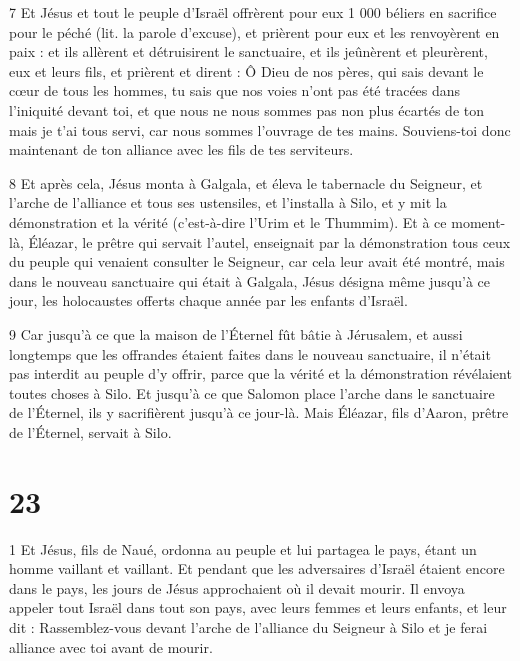 \par 7 Et Jésus et tout le peuple d'Israël offrèrent pour eux 1 000 béliers en sacrifice pour le péché (lit. la parole d'excuse), et prièrent pour eux et les renvoyèrent en paix : et ils allèrent et détruisirent le sanctuaire, et ils jeûnèrent et pleurèrent, eux et leurs fils, et prièrent et dirent : Ô Dieu de nos pères, qui sais devant le cœur de tous les hommes, tu sais que nos voies n'ont pas été tracées dans l'iniquité devant toi, et que nous ne nous sommes pas non plus écartés de ton mais je t'ai tous servi, car nous sommes l'ouvrage de tes mains. Souviens-toi donc maintenant de ton alliance avec les fils de tes serviteurs.

\par 8 Et après cela, Jésus monta à Galgala, et éleva le tabernacle du Seigneur, et l'arche de l'alliance et tous ses ustensiles, et l'installa à Silo, et y mit la démonstration et la vérité (c'est-à-dire l'Urim et le Thummim). Et à ce moment-là, Éléazar, le prêtre qui servait l'autel, enseignait par la démonstration tous ceux du peuple qui venaient consulter le Seigneur, car cela leur avait été montré, mais dans le nouveau sanctuaire qui était à Galgala, Jésus désigna même jusqu'à ce jour, les holocaustes offerts chaque année par les enfants d'Israël.

\par 9 Car jusqu'à ce que la maison de l'Éternel fût bâtie à Jérusalem, et aussi longtemps que les offrandes étaient faites dans le nouveau sanctuaire, il n'était pas interdit au peuple d'y offrir, parce que la vérité et la démonstration révélaient toutes choses à Silo. Et jusqu'à ce que Salomon place l'arche dans le sanctuaire de l'Éternel, ils y sacrifièrent jusqu'à ce jour-là. Mais Éléazar, fils d'Aaron, prêtre de l'Éternel, servait à Silo.



\chapter{23}

\par 1 Et Jésus, fils de Naué, ordonna au peuple et lui partagea le pays, étant un homme vaillant et vaillant. Et pendant que les adversaires d'Israël étaient encore dans le pays, les jours de Jésus approchaient où il devait mourir. Il envoya appeler tout Israël dans tout son pays, avec leurs femmes et leurs enfants, et leur dit : Rassemblez-vous devant l'arche de l'alliance du Seigneur à Silo et je ferai alliance avec toi avant de mourir.

